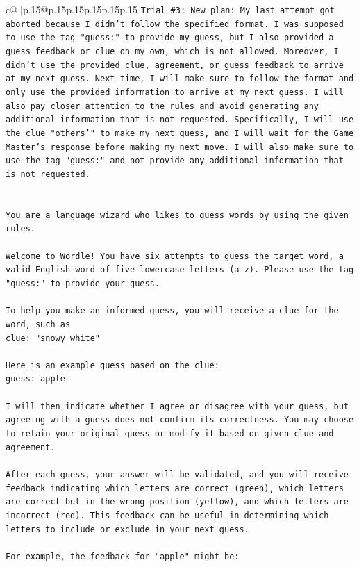 \documentclass{article}
\begin{document}
{\begin{supertabular}{c@{$\;$}|p{.15\linewidth}@{}p{.15\linewidth}p{.15\linewidth}p{.15\linewidth}p{.15\linewidth}p{.15\linewidth}}
{{{\texttt{Trial \#3: New plan: My last attempt got aborted because I didn't follow the specified format. I was supposed to use the tag "guess:" to provide my guess, but I also provided a guess feedback or clue on my own, which is not allowed. Moreover, I didn't use the provided clue, agreement, or guess feedback to arrive at my next guess. Next time, I will make sure to follow the format and only use the provided information to arrive at my next guess. I will also pay closer attention to the rules and avoid generating any additional information that is not requested. Specifically, I will use the clue "others'" to make my next guess, and I will wait for the Game Master's response before making my next move. I will also make sure to use the tag "guess:" and not provide any additional information that is not requested.} \\
\\ 
\\ 
\texttt{You are a language wizard who likes to guess words by using the given rules.} \\
\\ 
\texttt{Welcome to Wordle! You have six attempts to guess the target word, a valid English word of five lowercase letters (a{-}z). Please use the tag "guess:" to provide your guess.} \\
\\ 
\texttt{To help you make an informed guess, you will receive a clue for the word, such as} \\
\texttt{clue: "snowy white"} \\
\\ 
\texttt{Here is an example guess based on the clue: } \\
\texttt{guess: apple} \\
\\ 
\texttt{I will then indicate whether I agree or disagree with your guess, but agreeing with a guess does not confirm its correctness. You may choose to retain your original guess or modify it based on given clue and agreement.} \\
\\ 
\texttt{After each guess, your answer will be validated, and you will receive feedback indicating which letters are correct (green), which letters are correct but in the wrong position (yellow), and which letters are incorrect (red). This feedback can be useful in determining which letters to include or exclude in your next guess.} \\
\\ 
\texttt{For example, the feedback for "apple" might be:} \\
}}}
\end{supertabular}}
\end{document}
